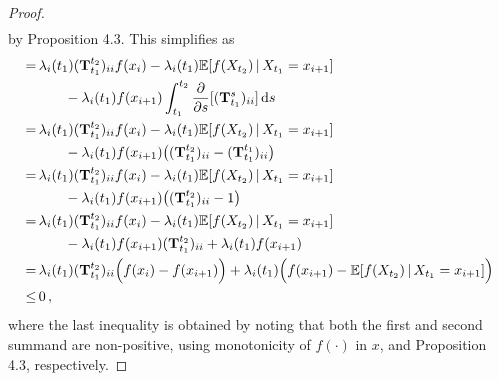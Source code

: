 \documentclass[10pt]{article}
\newcommand{\dx}[1][x]{\text{\,d}#1}
\begin{document}
\begin{proof}
\begin{align*}
\end{align*}
by Proposition 4.3. This simplifies as
\begin{align*}
 =&\,\lambda_i(t_1)(\mathbf{T}_{t_1}^{t_2})_{ii}f(x_i) - \lambda_i(t_1)\mathbb{E}[f(X_{t_2})\,\vert\,X_{t_1}=x_{i+1}] \\
 &\quad\quad - \lambda_i(t_1)f(x_{i+1})\int_{t_1}^{t_2}\frac{\partial}{\partial s}[(\mathbf{T}_{t_1}^s)_{ii}]\dx[s] \\
 =&\, \lambda_i(t_1)(\mathbf{T}_{t_1}^{t_2})_{ii}f(x_i) - \lambda_i(t_1)\mathbb{E}[f(X_{t_2})\,\vert\,X_{t_1}=x_{i+1}] \\
&\quad\quad- \lambda_i(t_1)f(x_{i+1})\bigl((\mathbf{T}_{t_1}^{t_2})_{ii} - (\mathbf{T}_{t_1}^{t_1})_{ii}\bigr)\\
 =&\, \lambda_i(t_1)(\mathbf{T}_{t_1}^{t_2})_{ii}f(x_i) - \lambda_i(t_1)\mathbb{E}[f(X_{t_2})\,\vert\,X_{t_1}=x_{i+1}] \\
 &\quad\quad- \lambda_i(t_1)f(x_{i+1})\bigl((\mathbf{T}_{t_1}^{t_2})_{ii} - 1\bigr)\\
 =&\, \lambda_i(t_1)(\mathbf{T}_{t_1}^{t_2})_{ii}f(x_i) - \lambda_i(t_1)\mathbb{E}[f(X_{t_2})\,\vert\,X_{t_1}=x_{i+1}] \\
 &\quad\quad- \lambda_i(t_1)f(x_{i+1})(\mathbf{T}_{t_1}^{t_2})_{ii} + \lambda_i(t_1)f(x_{i+1})\\
 =&\, \lambda_i(t_1)(\mathbf{T}_{t_1}^{t_2})_{ii}\Bigl(f(x_i) - f(x_{i+1})\Bigr) + \lambda_i(t_1)\Bigl(f(x_{i+1})-\mathbb{E}[f(X_{t_2})\,\vert\,X_{t_1}=x_{i+1}]\Bigr) \\
\leq&\, 0\,,
\end{align*}
where the last inequality is obtained by noting that both the first and second summand are non-positive, using monotonicity of $f(\cdot)$ in $x$, and Proposition 4.3, respectively.
\end{proof}
\end{document}

